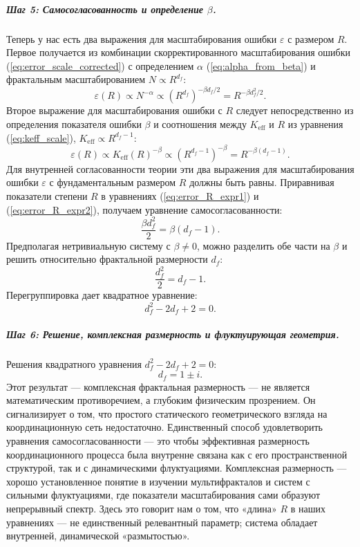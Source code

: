 \documentclass[12pt,a4paper]{article}
\theoremstyle{remark}
\newcommand{\Ke}{K_{\mathrm{eff}}}
\begin{document}
	\subparagraph*{Шаг 5: Самосогласованность и определение \(\beta\).}
	Теперь у нас есть два выражения для масштабирования ошибки \(\varepsilon\) с размером \(R\). Первое получается из комбинации скорректированного масштабирования ошибки (\ref{eq:error_scale_corrected}) с определением \(\alpha\) (\ref{eq:alpha_from_beta}) и фрактальным масштабированием \(N \propto R^{d_f}\):
	\begin{equation}
		\varepsilon(R) \propto N^{-\alpha} \propto (R^{d_f})^{-\beta d_f/2} = R^{-\beta d_f^2 / 2}.
		\label{eq:error_R_expr1}
	\end{equation}
	Второе выражение для масштабирования ошибки с \(R\) следует непосредственно из определения показателя ошибки \(\beta\) и соотношения между \(\Ke\) и \(R\) из уравнения (\ref{eq:keff_scale}), \(\Ke \propto R^{d_f-1}\):
	\begin{equation}
		\varepsilon(R) \propto \Ke(R)^{-\beta} \propto (R^{d_f-1})^{-\beta} = R^{-\beta(d_f-1)}.
		\label{eq:error_R_expr2}
	\end{equation}
	Для внутренней согласованности теории эти два выражения для масштабирования ошибки \(\varepsilon\) с фундаментальным размером \(R\) должны быть равны. Приравнивая показатели степени \(R\) в уравнениях (\ref{eq:error_R_expr1}) и (\ref{eq:error_R_expr2}), получаем уравнение самосогласованности:
	\begin{equation}
		\frac{\beta d_f^2}{2} = \beta (d_f - 1).
		\label{eq:consistency}
	\end{equation}
	Предполагая нетривиальную систему с \(\beta \neq 0\), можно разделить обе части на \(\beta\) и решить относительно фрактальной размерности \(d_f\):
	\begin{equation}
		\frac{d_f^2}{2} = d_f - 1.
	\end{equation}
	Перегруппировка дает квадратное уравнение:
	\begin{equation}
		d_f^2 - 2d_f + 2 = 0.
		\label{eq:quadratic}
	\end{equation}
	
	\subparagraph*{Шаг 6: Решение, комплексная размерность и флуктуирующая геометрия.}
	Решения квадратного уравнения \(d_f^2 - 2d_f + 2 = 0\):
	\begin{equation}
		d_f = 1 \pm i.
		\label{eq:df_solution}
	\end{equation}
	Этот результат — комплексная фрактальная размерность — не является математическим противоречием, а глубоким физическим прозрением. Он сигнализирует о том, что простого статического геометрического взгляда на координационную сеть недостаточно. Единственный способ удовлетворить уравнения самосогласованности — это чтобы эффективная размерность координационного процесса была внутренне связана как с его пространственной структурой, так и с динамическими флуктуациями. Комплексная размерность — хорошо установленное понятие в изучении мультифракталов и систем с сильными флуктуациями, где показатели масштабирования сами образуют непрерывный спектр. Здесь это говорит нам о том, что «длина» \(R\) в наших уравнениях — не единственный релевантный параметр; система обладает внутренней, динамической «размытостью».
	
\end{document}
